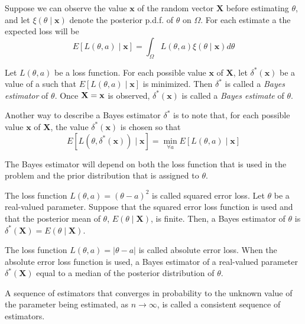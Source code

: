 {\color{red} 

Suppose we can observe the value $\mathbf{x}$ of the random vector $\mathbf{X}$ before estimating $\theta$, and let $\xi\left(\theta\mid\mathbf{x}\right)$ denote the posterior p.d.f. of $\theta$ on $\Omega$. For each estimate a the expected loss will be
\[
E\left[L\left(\theta,a\right)\mid\mathbf{x}\right]=\int_{\Omega}L\left(\theta,a\right)\xi\left(\theta\mid\mathbf{x}\right)d\theta
\]

\begin{definition}
Let $L\left(\theta,a\right)$ be a loss function. For each possible value $\mathbf{x}$ of $\mathbf{X}$, let $\delta^{\ast}\left(\mathbf{x}\right)$ be a value of a such that $E\left[L\left(\theta,a\right)\mid\mathbf{x}\right]$ is minimized. Then $\delta^{\ast}$ is called a \emph{Bayes estimator} of $\theta$. Once $\mathbf{X=\text{\ensuremath{\mathbf{x}}}}$ is observed, $\delta^{\ast}\left(\mathbf{x}\right)$ is called a \emph{Bayes estimate} of $\theta$.
\end{definition}

Another way to describe a Bayes estimator $\delta^{\ast}$ is to note that, for each possible value $\mathbf{x}$ of $\mathbf{X}$, the value $\delta^{\ast}\left( \mathbf{x} \right)$ is chosen so that
\[
E\left[L\left(\theta, \delta^{\ast}\left(\mathbf{x}\right) \right)\mid \mathbf{x} \right] = \min_{\forall a} E\left[L\left(\theta,a\right)\mid\mathbf{x}\right]
\]

The Bayes estimator will depend on both the loss function that is used in the problem and the prior distribution that is assigned to $\theta$.

\begin{example}
The loss function $L\left(\theta,a\right)=\left(\theta-a\right)^{2}$ is called squared error loss. Let $\theta$ be a real-valued parameter. Suppose that the squared error loss function is used and that the posterior mean of $\theta$, $E\left(\theta\mid\mathbf{X}\right)$, is finite. Then, a Bayes estimator of $\theta$ is $\delta^{\ast}\left(\mathbf{X}\right)=E\left(\theta\mid\mathbf{X}\right)$.

The loss function $L\left(\theta,a\right)=\left|\theta-a\right|$ is called absolute error loss. When the absolute error loss function is used, a Bayes estimator of a real-valued parameter $\delta^{\ast}\left(\mathbf{X}\right)$ equal to a median of the posterior distribution of $\theta$.
\end{example}

\begin{definition}
A sequence of estimators that converges in probability to the unknown value of the parameter being estimated, as $n \rightarrow \infty$, is called a consistent sequence of estimators.
\end{definition}

}
